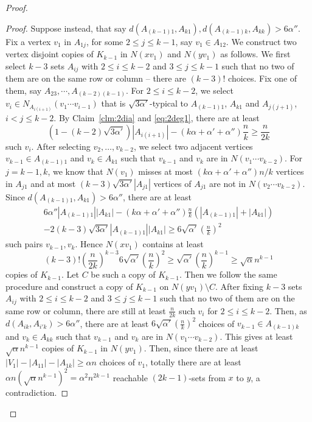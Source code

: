 \documentclass[reqno]{amsart}
\theoremstyle{plain}
\def\a{\alpha}
\def\sqa{\sqrt{3\alpha'}}
\begin{document}
\begin{proof}
\begin{proof}
Suppose instead, that say $d(A_{(k-1)1},A_{k1}),d(A_{(k-1)k},A_{kk})> 6 \alpha''$. 
Fix a vertex $v_1$ in $A_{1j}$, for some $2\le j\le k-1$, say $v_1\in A_{12}$. 
We construct two vertex disjoint copies of $K_{k-1}$ in $N(xv_1)$ and $N(yv_1)$ as follows. We first select $k-3$ sets $A_{ij}$ with $2\le i\le k-2$ and $3\le j\le k-1$ such that no two of them are on the same row or column -- there are $(k-3)!$ choices. Fix one of them, say
$A_{23},\cdots,A_{(k-2)(k-1)}$. For $2 \le i\le k-2$, we select $v_i\in N_{A_{i(i+1)}}(v_1 \cdots v_{i-1})$ that is $\sqa$-typical to $A_{(k-1)1}$, $A_{k1}$ and $A_{j(j+1)}$, $i< j\le k-2$. By Claim~\ref{clm:2dia} and \eqref{eq:2deg1}, there are at least
\[
(1- (k-2)\sqa) |A_{i(i+1)}| - (k\alpha+\alpha' + \alpha'') \frac{n}{k} \ge \frac{n}{2k}
\]
such $v_i$.
After selecting $v_2, \dots, v_{k-2}$, we select two adjacent vertices $v_{k-1}\in A_{(k-1)1}$ and $v_k\in A_{k1}$ such that $v_{k-1}$ and $v_k$ are in $N(v_1 \cdots v_{k-2})$. For $j=k-1, k$, we know that $N(v_1)$ misses at most $(k\alpha+ \alpha' + \alpha'') n/k$ vertices in $A_{j1}$ and at most $(k-3)\sqa |A_{j1}|$ vertices of $A_{j1}$ are not in $N(v_2 \cdots v_{k-2})$. Since $d(A_{(k-1)1},A_{k1})> 6 \alpha''$, there are at least
\begin{align*}
6\alpha'' |A_{(k-1)1}| |A_{k1}|  - (k\alpha+\alpha' + \alpha'') \frac{n}{k} (|A_{(k-1)1}| + |A_{k1}|) \\
- 2 (k-3)\sqa |A_{(k-1)1}| |A_{k1}| \ge 6 \sqrt{\alpha'} \left(\frac{n}{k} \right)^2
\end{align*}
such pairs $v_{k-1}, v_k$. Hence $N(xv_1)$ contains at least
\[
(k-3)! \left(\frac{n}{2k} \right)^{k-3} 6 \sqrt{\alpha'} \left(\frac{n}{k} \right)^2 \ge \sqrt{\alpha'} \left(\frac{n}{k} \right)^{k-1} \ge \sqrt{\alpha} n^{k-1}
\]
copies of $K_{k-1}$. Let $C$ be such a copy of $K_{k-1}$. Then we follow the same procedure and construct a copy of $K_{k-1}$ on $N(yv_1)\setminus C$. After fixing $k-3$ sets $A_{ij}$ with $2\le i\le k-2$ and $3\le j\le k-1$ such that no two of them are on the same row or column, there are still at least $\frac{n}{2k}$ such $v_i$ for $2\le i\le k-2$.
Then, as $d(A_{ik},A_{i'k})> 6 \alpha''$, there are at least $6 \sqrt{\alpha'} \left(\frac{n}{k} \right)^2 $ choices of $v_{k-1}\in A_{(k-1)k}$ and $v_k\in A_{kk}$ such that $v_{k-1}$ and $v_k$ are in $N(v_1 \cdots v_{k-2})$. This gives at least $\sqrt{\alpha} n^{k-1}$ copies of $K_{k-1}$ in $N(yv_1)$. Then, since there are at least $|V_1| - |A_{11}| - |A_{1k}| \ge \a n$ choices of $v_1$, totally there are at least $\a n (\sqrt{\a} n^{k-1})^2 = \a^2 n^{2k-1}$ reachable $(2k-1)$-sets from $x$ to $y$, a contradiction.
\end{proof}


\end{proof}
\end{document}
